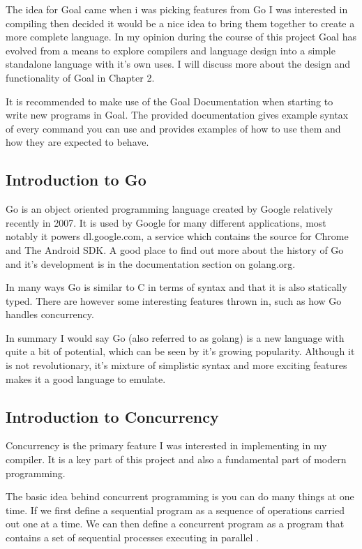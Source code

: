 The idea for Goal came when i was picking features from Go I was interested in compiling then decided it would be a nice idea to bring them together to create a more complete language. In my opinion during the course of this project Goal has evolved from a means to explore compilers and language design into a simple standalone language with it's own uses. I will discuss more about the design and functionality of Goal in Chapter 2.

It is recommended to make use of the Goal Documentation when starting to write new programs in Goal. The provided documentation gives example syntax of every command you can use and provides examples of how to use them and how they are expected to behave.

\subsection{Introduction to Go}

Go is an object oriented programming language created by Google relatively recently in 2007. It is used by Google for many different applications, most notably it powers dl.google.com, a service which contains the source for Chrome and The Android SDK. A good place to find out more about the history of Go and it's development is in the documentation section on golang.org.

In many ways Go is similar to C in terms of syntax and that it is also statically typed. There are however some interesting features thrown in, such as how Go handles concurrency.

In summary I would say Go (also referred to as golang) is a new language with quite a bit of potential, which can be seen by it's growing popularity. Although it is not revolutionary, it's mixture of simplistic syntax and more exciting features makes it a good language to emulate.


\subsection{Introduction to Concurrency}

Concurrency is the primary feature I was interested in implementing in my compiler. It is a key part of this project and also a fundamental part of modern programming. 

The basic idea behind concurrent programming is you can do many things at one time. If we first define a sequential program as a sequence of operations carried out one at a time. We can then define a concurrent program as a program that contains a set of sequential processes executing in parallel \cite[p.~414]{CompGen1997}.

